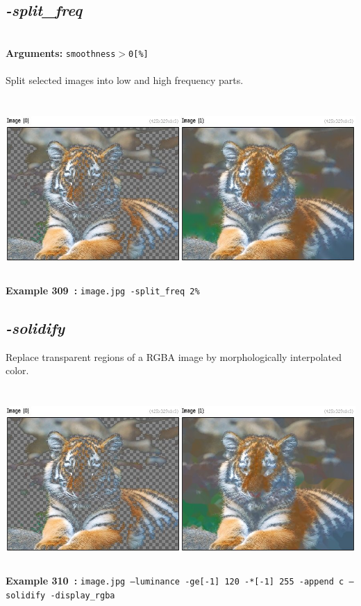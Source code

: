\documentclass[a4paper,11pt,twoside]{book}
\begin{document}
\subsection{\emph{-split\_freq} }\vspace*{-0.5em}
~\\\textbf{Arguments: } 
{\small \texttt{smoothness$>$0[\%]}}\\~\\
Split selected images into low and high frequency parts.
\begin{center}\includegraphics[keepaspectratio=true,height=7cm,width=\textwidth]{img/gmic_def309.jpg}\\
{\footnotesize \textbf{Example 309~:} \texttt{image.jpg -split\_freq 2\%}}
\end{center}

\subsection{\emph{-solidify} }\vspace*{-0.5em}
Replace transparent regions of a RGBA image by morphologically interpolated color.
\begin{center}\includegraphics[keepaspectratio=true,height=7cm,width=\textwidth]{img/gmic_def310.jpg}\\
{\footnotesize \textbf{Example 310~:} \texttt{image.jpg --luminance -ge[-1] 120 -*[-1] 255 -append c --solidify -display\_rgba}}
\end{center}
\end{document}
